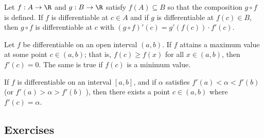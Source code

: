 \begin{tcolorbox}
    \begin{thm}
    Let \( f: A \to \R  \) and \( g: B \to \R  \) satisfy \( f(A) \subseteq B  \) so that the composition \(  g  \circ f \) is defined. If \( f  \) is differentiable at \( c \in A  \) and if \( g  \) is differentiable at \( f(c) \in B   \), then \( g \circ f  \) is differentiable at \( c  \) with \( (g \circ f)'(c) = g'(f(c)) \cdot f'(c)\).
    \end{thm}
\end{tcolorbox}

\begin{tcolorbox}
    \begin{thm} Let \( f  \) be differentiable on an open interval \( (a,b)  \). If \( f  \) attains a maximum value at some point \( c \in (a,b)  \); that is, \( f(c) \geq f(x)  \) for all \( x \in (a,b)  \), then \( f'(c) = 0  \). The same is true if \( f(c)  \) is a minimum value.

\end{thm}
\end{tcolorbox}

\begin{tcolorbox}
    \begin{thm}
    If \( f  \) is differentiable on an interval \( [a,b]  \), and if \( \alpha  \) satisfies \( f'(a) < \alpha < f'(b)  \) (or \( f'(a) > \alpha > f'(b)  \) ), then there exists a point \( c \in (a,b)  \) where \( f'(c) = \alpha \).
    \end{thm}
\end{tcolorbox}
\subsection{Exercises}


